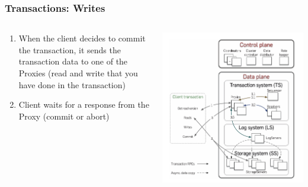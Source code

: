 \begin{frame}
    \frametitle{Transactions: Writes}
    \begin{columns}
        \begin{column}{0.5\textwidth}
            \begin{enumerate}
                    \item When the client decides to commit the transaction, it sends the transaction data to one of the Proxies (read and write that you have done in the transaction)
                \item Client waits for a response from the Proxy (commit or abort)
            \end{enumerate}
        \end{column}
        \begin{column}{0.5\textwidth}
            \centering
            \includegraphics[width=\textwidth]{img/2-Architecture/Architecture and transaction processing.png}
        \end{column}
    \end{columns}
\end{frame}


